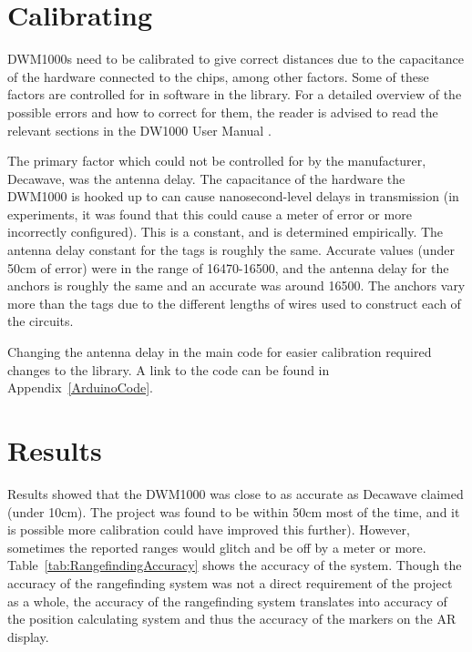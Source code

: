 \section{Calibrating}
DWM1000s need to be calibrated to give correct distances due to the capacitance of the hardware connected to the chips, among other factors. Some of these factors are controlled for in software in the  library. For a detailed overview of the possible errors and how to correct for them, the reader is advised to read the relevant sections in the DW1000 User Manual \cite{DW1000UserManual}.

The primary factor which could not be controlled for by the manufacturer, Decawave, was the antenna delay. The capacitance of the hardware the DWM1000 is hooked up to can cause nanosecond-level delays in transmission (in experiments, it was found that this could cause a meter of error or more incorrectly configured). This is a constant, and is determined empirically. The antenna delay constant for the tags is roughly the same. Accurate values (under 50cm of error) were in the range of 16470-16500, and the antenna delay for the anchors is roughly the same and an accurate was around 16500. The anchors vary more than the tags due to the different lengths of wires used to construct each of the circuits.

Changing the antenna delay in the main code for easier calibration required changes to the  library. A link to the code can be found in Appendix~\ref{ArduinoCode}.

\section{Results}
\label{RangefindingResults}
Results showed that the DWM1000 was close to as accurate as Decawave claimed (under 10cm). The project was found to be within 50cm most of the time, and it is possible more calibration could have improved this further). However, sometimes the reported ranges would glitch and be off by a meter or more. Table~\ref{tab:RangefindingAccuracy} shows the accuracy of the system. Though the accuracy of the rangefinding system was not a direct requirement of the project as a whole, the accuracy of the rangefinding system translates into accuracy of the position calculating system and thus the accuracy of the markers on the AR display.

